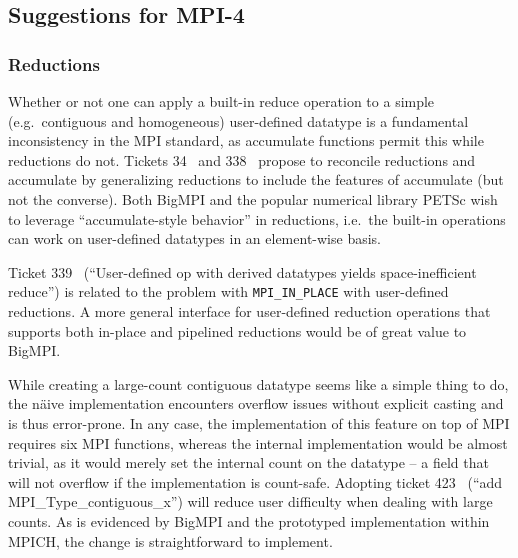 
\subsection{Suggestions for MPI-4}

\subsubsection{Reductions}

Whether or not one can apply a built-in reduce operation to a simple 
(e.g.\ contiguous and homogeneous) user-defined datatype
is a fundamental inconsistency in the MPI standard, as accumulate
functions permit this while reductions do not.
Tickets 34~\cite{ticket34} and 338~\cite{ticket338}
propose to reconcile reductions and accumulate by generalizing
reductions to include the features of accumulate (but not the converse).
Both BigMPI and the popular numerical library PETSc wish to leverage 
``accumulate-style behavior'' in reductions, i.e.\  the built-in operations 
can work on user-defined datatypes in an element-wise basis.

Ticket 339~\cite{ticket339} %
(``User-defined op with derived datatypes yields space-inefficient reduce'')
is related to the problem with \texttt{MPI\_IN\_PLACE} with user-defined reductions.
A more general interface for user-defined reduction operations that supports both
in-place and pipelined reductions would be of great value to BigMPI.

While creating a large-count contiguous datatype seems like a simple thing to do,
the n{\"a}ive implementation encounters overflow issues without explicit casting and is
thus error-prone.  In any case, the implementation of this feature on top of MPI
requires six MPI functions, whereas the internal implementation would be almost trivial,
as it would merely set the internal count on the datatype -- a field that will not overflow 
if the implementation is count-safe.
Adopting ticket 423~\cite{ticket423} %
(``add MPI\_Type\_contiguous\_x'') will reduce user difficulty when dealing with large counts.
As is evidenced by BigMPI and the prototyped implementation within MPICH, 
the change is straightforward to implement.

